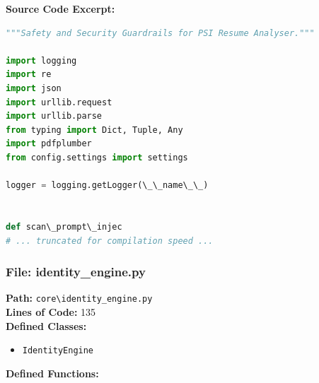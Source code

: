 \documentclass[10pt,journal,compsoc]{IEEEtran}
\begin{document}
\textbf{Source Code Excerpt:}
\begin{lstlisting}[language=Python]
"""Safety and Security Guardrails for PSI Resume Analyser."""

import logging
import re
import json
import urllib.request
import urllib.parse
from typing import Dict, Tuple, Any
import pdfplumber
from config.settings import settings

logger = logging.getLogger(\_\_name\_\_)


def scan\_prompt\_injec
# ... truncated for compilation speed ...
\end{lstlisting}

\subsubsection{File: identity\_engine.py}
\textbf{Path:} \texttt{core\textbackslash{}identity\_engine.py} \\
\textbf{Lines of Code:} 135 \\
\textbf{Defined Classes:}
\begin{itemize}
    \item \texttt{IdentityEngine}
\end{itemize}
\textbf{Defined Functions:}
\end{document}
